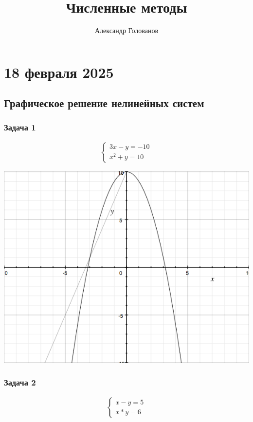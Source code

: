 \documentclass[]{article}
\title{Численные методы}
\author{Александр Голованов}
\begin{document}
\maketitle
\newpage
\tableofcontents
\newpage

\section{18 февраля 2025}
\subsection{Графическое решение нелинейных систем}

\subsubsection{Задача 1}

\begin{gather*}
\begin{cases}
3x-y =-10\\
x^2+y=10
\end{cases}
\end{gather*}

\begingroup
\centering
\includegraphics[scale=0.3]{graph1}
\endgroup

\subsubsection{Задача 2}

\begin{gather*}
\begin{cases}
x-y =5\\
x*y=6
\end{cases}
\end{gather*}
\end{document}
